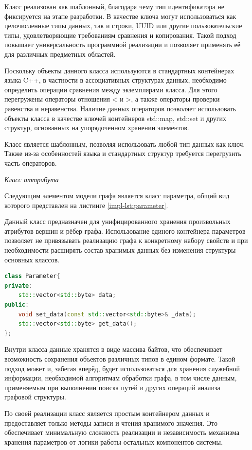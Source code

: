 Класс реализован как шаблонный, благодаря чему тип идентификатора не фиксируется на этапе разработки. В качестве ключа могут использоваться как целочисленные типы данных, так и строки, UUID или другие пользовательские типы, удовлетворяющие требованиям сравнения и копирования. Такой подход повышает универсальность программной реализации и позволяет применять её для различных предметных областей.

Поскольку объекты данного класса используются в стандартных контейнерах языка C++, в частности в ассоциативных структурах данных, необходимо определить операции сравнения между экземплярами класса. Для этого перегружены операторы отношения < и >, а также операторы проверки равенства и неравенства. Наличие данных операторов позволяет использовать объекты класса в качестве ключей контейнеров std::map, std::set и других структур, основанных на упорядоченном хранении элементов.

Класс является шаблонным, позволяя использовать любой тип данных как ключ. Также из-за особенностей языка и стандартных структур требуется перегрузить часть операторов.

\textit{Класс аттрибута}

Следующим элементом модели графа является класс параметра, общий вид которого представлен на листинге \ref{impl-lst:parameter}.

Данный класс предназначен для унифицированного хранения произвольных атрибутов вершин и рёбер графа. Использование единого контейнера параметров позволяет не привязывать реализацию графа к конкретному набору свойств и при необходимости расширять состав хранимых данных без изменения структуры основных классов.

\begin{lstlisting}[language=C++, caption=Класс Parameter, label=impl-lst:parameter]
class Parameter{
private:
    std::vector<std::byte> data;
public:
    void set_data(const std::vector<std::byte>& _data);
    std::vector<std::byte> get_data();
};
\end{lstlisting}

Внутри класса данные хранятся в виде массива байтов, что обеспечивает возможность сохранения объектов различных типов в едином формате. Такой подход может и, забегая вперёд, будет использоваться для хранения служебной информации, необходимой алгоритмам обработки графа, в том числе данным, применяемым при выполнении поиска путей и других операций анализа графовой структуры.

По своей реализации класс является простым контейнером данных и предоставляет только методы записи и чтения хранимого значения. Это обеспечивает минимальную сложность реализации и независимость механизма хранения параметров от логики работы остальных компонентов системы.

